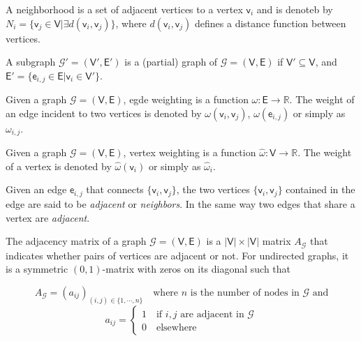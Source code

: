 \begin{definition}[Neighborhood]
	A neighborhood is a set of adjacent vertices to a vertex $\mathsf{v}_i$ and is denoteb by $N_i = \{\mathsf{v}_j \in \mathsf{V}  | \exists d(\mathsf{v}_i, \mathsf{v}_j)\}$, where $d(\mathsf{v}_i, \mathsf{v}_j)$ defines a distance function between vertices.
\end{definition}

\begin{definition}[Subgraph]
	A subgraph $\mathcal{G}'= (\mathsf{V}', \mathsf{E}')$ is a (partial) graph of $\mathcal{G}=(\mathsf{V}, \mathsf{E})$ if $\mathsf{V}' \subseteq \mathsf{V}$, and  $\mathsf{E}'= \{\mathsf{e}_{i,j} \in \mathsf{E} | \mathsf{v}_i \in \mathsf{V}' \}$.
\end{definition}

\begin{definition}
	Given a graph $\mathcal{G}=(\mathsf{V}, \mathsf{E})$, egde weighting is a function $\omega: \mathsf{E} \rightarrow \mathbb{R}$. The weight of an edge incident to two vertices is denoted by  $\omega(\mathsf{v}_{i}, \mathsf{v}_{j})$, $ \omega(\mathsf{e}_{i,j})$ or simply as $\omega_{i,j}$.
\end{definition}

\begin{definition}
	Given a graph $\mathcal{G}=(\mathsf{V}, \mathsf{E})$, vertex weighting is a function $\hat{\omega}: \mathsf{V} \rightarrow \mathbb{R}$. The weight of a vertex is denoted by  $\hat{\omega}(\mathsf{v}_{i})$ or simply as $\hat{\omega}_{i}$.
\end{definition}

\begin{definition}[Adjacency]
	Given an edge $\mathsf{e}_{i,j}$ that connects $\{\mathsf{v}_{i}, \mathsf{v}_{j}\} $, the two vertices $\{\mathsf{v}_{i}, \mathsf{v}_{j}\}$ contained in the edge are said to be \textit{adjacent} or \textit{neighbors}. In the same way two edges that share a vertex are \textit{adjacent}.
\end{definition}

\begin{definition}
	The adjacency matrix of a graph $\mathcal{G}=(\mathsf{V}, \mathsf{E})$ is a $|\mathsf{V}| \times |\mathsf{V}|$ matrix $A_{\mathcal{G}}$ that indicates whether pairs of vertices are adjacent or not. For undirected graphs, it is a symmetric $(0,1)$-matrix with zeros on its diagonal such that 
	
	\begin{equation}	
		A_{\mathcal{G}} = (a_{ij})_{(i, j)\in \{1,\cdots, n\}}  \quad \text{where $n$ is the number of nodes in $\mathcal{G}$ and} \nonumber 		
	\end{equation}
	\begin{equation}	
		a_{ij}= 
		\begin{cases}
			1 \quad \text{if $i, j$ are adjacent in $\mathcal{G}$} \\
			0 \quad \text{elsewhere}
		\end{cases}		\nonumber		
	\end{equation}
\end{definition}


